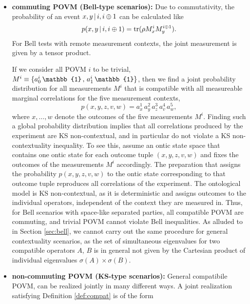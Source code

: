 \begin{itemize}
    \item \textbf{commuting POVM (Bell-type scenarios):}
    Due to commutativity, the probability of an event $x,y\thinspace\vert\thinspace i,i\oplus 1$ can be calculated like
    \begin{equation*}
        p(x,y\thinspace\vert\thinspace i,i\oplus 1) = \operatorname{tr}(\rho M_x^i M_y^{i\oplus 1}).
    \end{equation*}
    For Bell tests with remote measurement contexts, the joint measurement is given by a tensor product.
    
    If we consider all POVM $i$ to be trivial, $M^i\equiv\{a^i_0\thinspace\mathbb{1}\thinspace,\thinspace a^i_1\thinspace\mathbb{1}\}$, then we find a joint probability distribution for all measurements $M^i$ that is compatible with all measureable marginal correlations for the five measurement contexts,
    \begin{equation*}
        p(x,y,z,v,w)=a^1_{x}\,a^2_{y}\,a^3_{z}\,a^4_{v}\,a^5_{w},
    \end{equation*}
    where $x,\dots,w$ denote the outcomes of the five measurements $M^i$. Finding such a global probability distribution implies that all correlations produced by the experiment are KS non-contextual, and in particular do not violate a KS non-contextuality inequality. To see this, assume an ontic state space that contains one ontic state for each outcome tuple $(x,y,z,v,w)$ and fixes the outcomes of the measurements $M^i$ accordingly. The preparation that assigns the probability $p(x,y,z,v,w)$ to the ontic state corresponding to that outcome tuple reproduces all correlations of the experiment. The ontological model is KS non-contextual, as it is deterministic and assigns outcomes to the individual operators, independent of the context they are measured in. Thus, for Bell scenarios with space-like separated parties, all compatible POVM are commuting, and trivial POVM cannot violate Bell inequalities. As alluded to in Section \ref{sec:bell}, we cannot carry out the same procedure for general contextuality scenarios, as the set of simultaneous eigenvalues for two compatible operators $A$, $B$ is in general not given by the Cartesian product of individual eigenvalues $\sigma(A)\times\sigma(B)$.
    \item \textbf{non-commuting POVM (KS-type scenarios):}
    General compatibile POVM, can be realized jointly in many different ways. A joint realization satisfying Definition \ref{def:compat} is of the form \begin{equation*}

\end{equation*}
\end{itemize}
